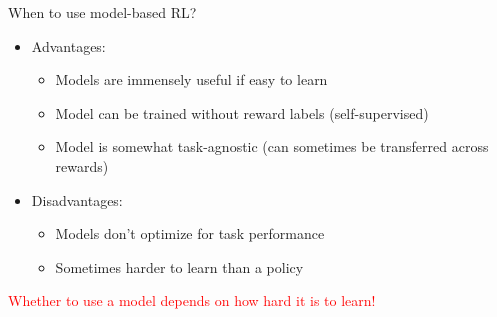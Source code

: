 \begin{frame}{When to use model-based RL?}
\begin{itemize}
    \item Advantages:
    \begin{itemize}
        \item Models are immensely useful if easy to learn
        \item Model can be trained without reward labels (self-supervised)
        \item Model is somewhat task-agnostic (can sometimes be transferred
              across rewards)
    \end{itemize}
    \item Disadvantages:
    \begin{itemize}
        \item Models don't optimize for task performance
        \item Sometimes harder to learn than a policy
    \end{itemize}
\end{itemize}
\vspace{1.5em}
\begin{center}
\textcolor{red}{Whether to use a model depends on how hard it is to learn!}
\end{center}
\end{frame}
